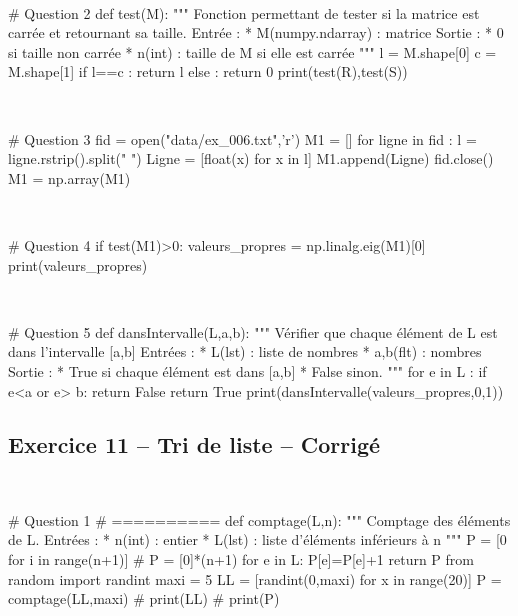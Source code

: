 \documentclass[10pt,fleqn]{article} %
\begin{document}
\begin{corrige}
$\quad$
\begin{python}
# Question 2
def test(M):
    """
    Fonction permettant de tester si la
    matrice est carrée et retournant sa taille.
    Entrée : 
     * M(numpy.ndarray) : matrice
    Sortie :
     * 0 si taille non carrée
     * n(int) : taille de M si elle est carrée
    """
    l = M.shape[0]
    c = M.shape[1]
    if l==c :
        return l
    else : 
        return 0
print(test(R),test(S))
\end{python}
\end{corrige}

\begin{corrige}
$\quad$
\begin{python}
# Question 3
fid = open("data/ex_006.txt",'r')
M1 = []
for ligne in fid :
    l = ligne.rstrip().split(" ")
    Ligne = [float(x) for x in l]
    M1.append(Ligne)
fid.close()
M1 = np.array(M1)
\end{python}
\end{corrige}

\begin{corrige}
$\quad$
\begin{python}
# Question 4
if test(M1)>0:
    valeurs_propres = np.linalg.eig(M1)[0]
    print(valeurs_propres)
\end{python}
\end{corrige}

\begin{corrige}
$\quad$
\begin{python}
# Question 5
def dansIntervalle(L,a,b):
    """
    Vérifier que chaque élément de L est dans 
    l'intervalle [a,b]
    Entrées : 
     * L(lst) : liste de nombres
     * a,b(flt) : nombres
    Sortie : 
     * True si chaque élément est dans [a,b]
     * False sinon. 
    """   
    for e in L :
        if e<a or e> b:
            return False
    return True
print(dansIntervalle(valeurs_propres,0,1))
\end{python}
\end{corrige}

\subsection*{Exercice 11 -- Tri de liste -- Corrigé}

\begin{corrige}
$\quad$
\begin{python}
# Question 1 
# ==========
def comptage(L,n):
    """
    Comptage des éléments de L.
    Entrées :
     * n(int) : entier
     * L(lst) : liste d'éléments inférieurs à n
    """
    P = [0 for i in range(n+1)]
    # P = [0]*(n+1)
    for e in L:
        P[e]=P[e]+1
    return P
from random import randint
maxi = 5
LL = [randint(0,maxi) for x in range(20)]
P = comptage(LL,maxi)
# print(LL)
# print(P)
\end{python}

\end{corrige}
\end{document}
